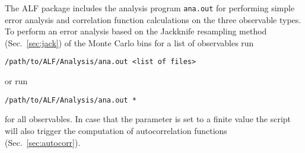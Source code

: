 The ALF package includes the analysis program \texttt{ana.out} for performing simple error analysis and correlation function calculations on the three observable types. To perform an error analysis based on the Jackknife resampling method~\cite{efron1981} (Sec.~\ref{sec:jack}) of the Monte Carlo bins for a list of observables run
\begin{lstlisting}[style=bash]
/path/to/ALF/Analysis/ana.out <list of files>
\end{lstlisting}
or run
\begin{lstlisting}[style=bash]
/path/to/ALF/Analysis/ana.out *
\end{lstlisting}
for all observables.
%
In case that the parameter  is set to a finite value the script will also trigger the computation of autocorrelation functions (Sec.~\ref{sec:autocorr}).



